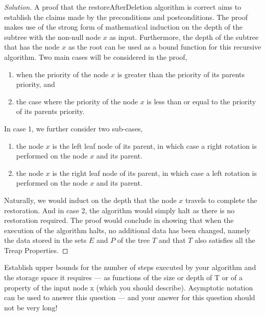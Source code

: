 \documentclass[12pt]{article}
\newenvironment{problem}[2][Problem]{\begin{trivlist}
\item[\hskip \labelsep {\bfseries #1}\hskip \labelsep {\bfseries #2.}]}{\end{trivlist}}
\newenvironment{solution}{\renewcommand\qedsymbol{$\blacksquare$}\begin{proof}[Solution]}{\end{proof}}
\begin{document}
\begin{solution}
    A proof that the restoreAfterDeletion algorithm is correct aims to establish the claims made by the preconditions and postconditions. The proof makes use of the strong form of mathematical induction on the depth of the subtree with the non-null node $x$ as input. Furthermore, the depth of the subtree that has the node $x$ as the root can be used as a bound function for this recursive algorithm. Two main cases will be considered in the proof, 

    \begin{enumerate}
        \item when the priority of the node $x$ is greater than the priority of its parents priority, and
        \item the case where the priority of the node $x$ is less than or equal to the priority of its parents priority.
    \end{enumerate}

    \noindent In case 1, we further consider two sub-cases,

    \begin{enumerate}
        \item the node $x$ is the left leaf node of its parent, in which case a right rotation is performed on the node $x$ and its parent. 
        \item the node $x$ is the right leaf node of its parent, in which case a left rotation is performed on the node $x$ and its parent.
    \end{enumerate}

    \noindent Naturally, we would induct on the depth that the node $x$ travels to complete the restoration. And in case 2, the algorithm would simply halt as there is no restoration required. The proof would conclude in showing that when the execution of the algorithm halts, no additional data has been changed, namely the data stored in the sets $E$ and $P$ of the tree $T$ and that $T$ also satisfies all the Treap Properties.

\end{solution}


\begin{problem}{5}
    Establish upper bounds for the number of steps executed by your algorithm and the storage space it requires — as functions of the size or depth of T or of a property of the input node x (which you should describe). Asymptotic notation can be used to answer this question — and your answer for this question should not be very long!
\end{problem}
\end{document}
